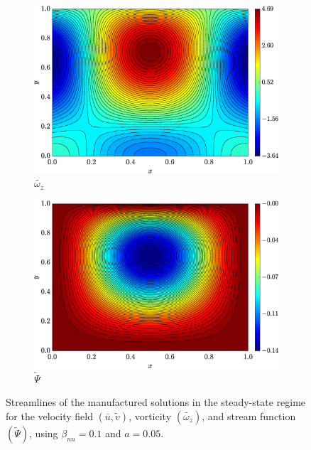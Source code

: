 \documentclass[preprint, 12pt]{elsarticle}
\begin{document}
\begin{figure}[H]
\begin{subfigure}[b]{.46\textwidth}
        \includegraphics[width=\textwidth]{Exact_Map_NormErr_2nd_Betann_0.1_Re_1_Wi_1_epsilon_0_xi_0_alphaG_0_Dt_1e-06_at_0.05_tipsim_1_MMS_12_Wz.eps}
        \caption{$\widetilde{\omega_{z}}$}
        \label{fig_solexawzstreamlineCase1}
    \end{subfigure}
    \vspace{0.2cm}
    \begin{subfigure}[b]{.46\textwidth}
        \includegraphics[width=\textwidth]{Exact_Map_NormErr_2nd_Betann_0.1_Re_1_Wi_1_epsilon_0_xi_0_alphaG_0_Dt_1e-06_at_0.05_tipsim_1_MMS_12_Psi.eps}
        \caption{$\widetilde{\Psi}$}
        \label{fig_solexapsistreamlineCase1}
    \end{subfigure}
    \vspace{0.02cm}
    \caption{Streamlines of the manufactured solutions in the steady-state regime for the velocity field $(\overline{u},\widetilde{v})$, vorticity $(\widetilde{\omega_{z}})$, and stream function $(\widetilde{\Psi})$, using $\beta_{nn}=0.1$ and $a = 0.05$.\label{fig_U_m_u_sol_num_case1streamline2}}
\end{figure}
\end{document}
